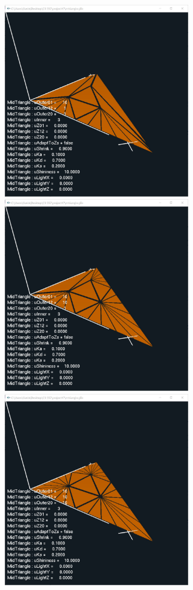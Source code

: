 \documentclass[letterpaper,14pt,titlepage,fleqn]{article}
\begin{document}
\begin{center}
	\includegraphics[width=3.2in]{out01.jpg}
	\includegraphics[width=3.2in]{out12.jpg}
	\includegraphics[width=3.2in]{out20.jpg}

\end{center}
\end{document}
